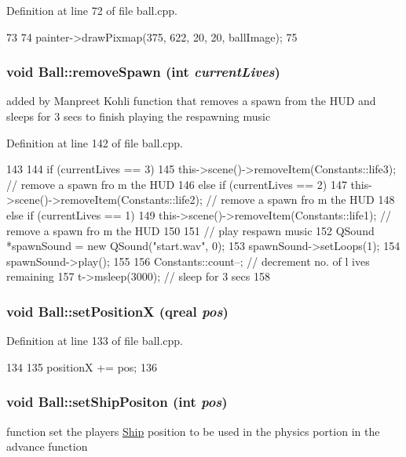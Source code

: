 Definition at line 72 of file ball.cpp.


\begin{DoxyCode}
73 {
74     painter->drawPixmap(375, 622, 20, 20, ballImage);
75 }
\end{DoxyCode}
\hypertarget{class_ball_a9da8ae4c7a2bd29919b8eae1ad5a3b1c}{
\subsubsection[{removeSpawn}]{\setlength{\rightskip}{0pt plus 5cm}void Ball::removeSpawn (int {\em currentLives})}}
\label{class_ball_a9da8ae4c7a2bd29919b8eae1ad5a3b1c}
added by Manpreet Kohli function that removes a spawn from the HUD and sleeps for 3 secs to finish playing the respawning music 

Definition at line 142 of file ball.cpp.


\begin{DoxyCode}
143 {
144     if (currentLives == 3)
145         this->scene()->removeItem(Constants::life3);        // remove a spawn fro
      m the HUD
146     else if (currentLives == 2)
147         this->scene()->removeItem(Constants::life2);        // remove a spawn fro
      m the HUD
148     else if (currentLives == 1)
149         this->scene()->removeItem(Constants::life1);        // remove a spawn fro
      m the HUD
150 
151     // play respawn music
152     QSound *spawnSound = new QSound("start.wav", 0);
153     spawnSound->setLoops(1);
154     spawnSound->play();
155 
156     Constants::count--;                                     // decrement no. of l
      ives remaining
157     t->msleep(3000);                                        // sleep for 3 secs
158 }
\end{DoxyCode}
\hypertarget{class_ball_aacd6dd3f04beb5d6cb7b09b3b8b42dda}{
\subsubsection[{setPositionX}]{\setlength{\rightskip}{0pt plus 5cm}void Ball::setPositionX (qreal {\em pos})}}
\label{class_ball_aacd6dd3f04beb5d6cb7b09b3b8b42dda}


Definition at line 133 of file ball.cpp.


\begin{DoxyCode}
134 {
135     positionX += pos;
136 }
\end{DoxyCode}
\hypertarget{class_ball_abcff8feb2c1c83085e07155a8aea088e}{
\subsubsection[{setShipPositon}]{\setlength{\rightskip}{0pt plus 5cm}void Ball::setShipPositon (int {\em pos})}}
\label{class_ball_abcff8feb2c1c83085e07155a8aea088e}
function set the players \hyperlink{class_ship}{Ship} position to be used in the physics portion in the advance function 

